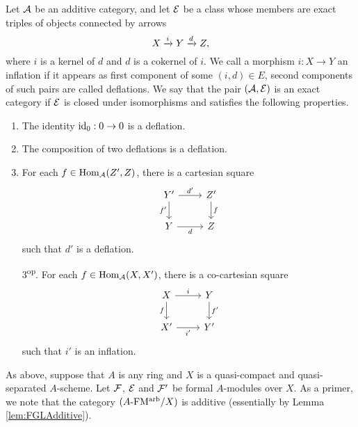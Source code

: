 \documentclass[../main.tex]{subfiles}
\begin{document}
\begin{defi}
  Let $\mathcal{A}$ be an additive category, and let $\mathcal{E}$ be a class whose
  members are exact triples of objects connected by arrows 
  \begin{equation*}
    X \xrightarrow{i} Y \xrightarrow{d} Z,
  \end{equation*}
  where $i$ is a kernel of $d$ and $d$ is a cokernel of $i$. 
  We call a morphism $i:X \to Y$ an inflation if it appears as first component
  of some $(i,d) \in E$, second components of such pairs are called deflations.
  We say that the pair $(\mathcal{A}, \mathcal{E})$ is an exact category if 
  $\mathcal{E}$ is closed under isomorphisms and satisfies the following properties.
  \begin{enumerate}
    \item The identity $\operatorname{id}_0: 0 \to 0$ is a deflation.
    \item The composition of two deflations is a deflation.
    \item For each $f \in \operatorname{Hom}_{\mathcal{A}}(Z', Z)$, there is a cartesian square
    \begin{equation*}
        \begin{tikzcd}[ampersand replacement=\&]
        	{Y'} \& {Z'} \\
        	Y \& Z
        	\arrow["{d'}", from=1-1, to=1-2]
        	\arrow["{f'}"', from=1-1, to=2-1]
        	\arrow["f", from=1-2, to=2-2]
        	\arrow["d"', from=2-1, to=2-2]
        \end{tikzcd}
    \end{equation*}
    such that $d'$ is a deflation.
  \item[3\textsuperscript{op}.] For each $f \in \operatorname{Hom}_{\mathcal{A}}(X, X')$, there is a
    co-cartesian square
      \begin{equation*}
        \begin{tikzcd}[ampersand replacement=\&]
        	X \& Y \\
        	{X'} \& {Y'}
        	\arrow["i", from=1-1, to=1-2]
        	\arrow["f"', from=1-1, to=2-1]
        	\arrow["{f'}", from=1-2, to=2-2]
        	\arrow["{i'}"', from=2-1, to=2-2]
        \end{tikzcd}
      \end{equation*}
      such that $i'$ is an inflation.
  \end{enumerate}
\end{defi}

As above, suppose that $A$ is any ring and $X$ is a quasi-compact and
quasi-separated $A$-scheme. Let $\mathcal{F}$, $\mathcal{E}$ and $\mathcal{F}'$ be formal $A$-modules
over $X$. As a primer, we note that the category ${({A}\text-\allowbreak\mathrm{FM^{arb}}/{X})}$ is additive 
(essentially by Lemma \ref{lem:FGLAdditive}).
\end{document}
